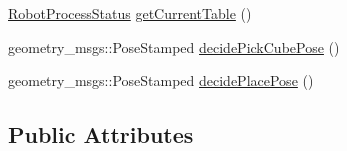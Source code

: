 \begin{DoxyCompactItemize}
\item 
\hyperlink{namespacesm__moveit__4_1_1cl__perception__system_a11dfa58fc66f2d368b894a9f1fec870e}{Robot\+Process\+Status} \hyperlink{classsm__moveit__4_1_1cl__perception__system_1_1ClPerceptionSystem_aa08e0d656ca31a618c0a4c496afe36af}{get\+Current\+Table} ()
\item 
geometry\+\_\+msgs\+::\+Pose\+Stamped \hyperlink{classsm__moveit__4_1_1cl__perception__system_1_1ClPerceptionSystem_ab4abc387e9053b62464a542378d779e5}{decide\+Pick\+Cube\+Pose} ()
\item 
geometry\+\_\+msgs\+::\+Pose\+Stamped \hyperlink{classsm__moveit__4_1_1cl__perception__system_1_1ClPerceptionSystem_ab2431f4f2f48fc474e7b2f868bdec60d}{decide\+Place\+Pose} ()
\end{DoxyCompactItemize}
\subsection*{Public Attributes}

